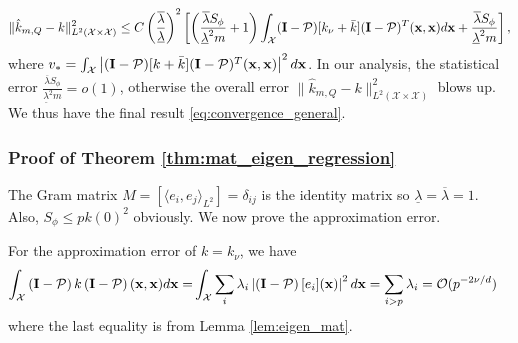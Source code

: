 \documentclass[aos,preprint]{imsart}
\theoremstyle{plain}
\newcommand{\CalO}{\mathcal O}
\newcommand{\CalX}{\mathcal X}
\newcommand{\CalP}{\mathcal P}
\newcommand{\BI}{\bold I}
\newcommand{\Bx}{\bold x}
\theoremstyle{remark}
\begin{document}
\begin{appendix}
\begin{equation*}
    \|\hat{k}_{m,Q}-k\|_{L^2(\CalX\times\CalX)}^2\leq C \left(\frac{\overline{\lambda}}{\underline{\lambda}}\right)^2 \left[\left(\frac{\overline{\lambda}S_\phi}{\underline{\lambda}^2m}+1\right)\int_\CalX(\bold{I}-\CalP)[k_\nu+\bar{k}](\bold{I}-\CalP)^T(\Bx,\Bx)d\Bx+\frac{\overline{\lambda}S_\phi}{\underline{\lambda}^2m}\right],
\end{equation*}
where $v_*=\int_\CalX\left|(\bold{I}-\CalP)[k+\bar{k}](\bold{I}-\CalP)^T(\Bx,\Bx)\right|^2d\Bx$. In our analysis, the statistical error $\frac{\overline{\lambda}S_\phi}{\underline{\lambda}^2m}=o(1)$, otherwise the overall error $ \|\hat{k}_{m,Q}-k\|_{L^2(\CalX\times\CalX)}^2$ blows up. We thus have the final result \eqref{eq:convergence_general}.
\endproof



\iffalse
\subsubsection{Proof of Theorem \ref{thm:mat_eigen_regression}}

The Gram matrix $M=[\langle e_i,e_j\rangle_{L^2}]=\delta_{ij}$ is the identity matrix so $\underline{\lambda}=\overline{\lambda}=1$.  Also, $S_\phi\leq pk(0)^2$ obviously. We now prove the approximation error. 

For the approximation error  of $k=k_\nu$, we have
\begin{align*}
    \int_\CalX\left(\BI-\CalP\right)k\left(\BI-\CalP\right)(\Bx,\Bx)d\Bx
    =&\int_\CalX\sum_i\lambda_i\left|\left(\BI-\CalP\right)[e_i](\Bx)\right|^2d\Bx
    =\sum_{i>p}\lambda_i =\CalO(p^{-2\nu/d})
\end{align*}
where the last equality is from Lemma \ref{lem:eigen_mat}.


\end{appendix}
\end{document}
